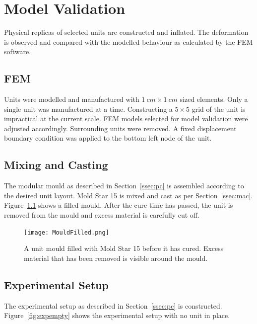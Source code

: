 \chapter{Model Validation}
\label{chp:MV}


Physical replicas of selected units are constructed and inflated. The deformation is observed and compared with the modelled behaviour as calculated by the FEM software.

\section{FEM}

Units were modelled and manufactured with $\SI{1}{cm}\times \SI{1}{cm}$ sized elements. Only a single unit was manufactured at a time. Constructing a $5\times 5$ grid of the unit is impractical at the current scale. FEM models selected for model validation were adjusted accordingly. Surrounding units were removed. A fixed displacement boundary condition was applied to the bottom left node of the unit.

\section{Mixing and Casting}

The modular mould as described in Section~\ref{ssec:pc} is assembled according to the desired unit layout. Mold Star 15 is mixed and cast as per Section~\ref{ssec:mac}. Figure~\ref{fig:fillmould} shows a filled mould. After the cure time has passed, the unit is removed from the mould and excess material is carefully cut off. 

\begin{figure}[H]
	\centering
	\texttt{[image: MouldFilled.png]}
	\caption[A filled unit mould]{A unit mould filled with Mold Star 15 before it has cured. Excess material that has been removed is visible around the mould.}
	\label{fig:fillmould}
\end{figure}

\section{Experimental Setup}

The experimental setup as described in Section~\ref{ssec:pc} is constructed. Figure~\ref{fig:expempty} shows the experimental setup with no unit in place.

